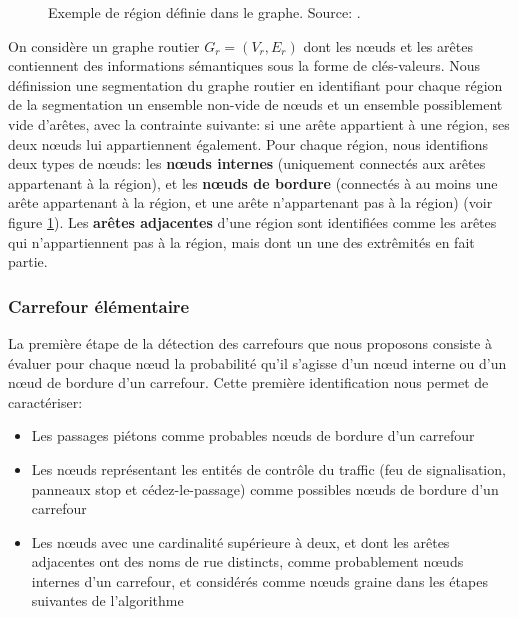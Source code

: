 \begin{figure}[ht]
    \centering
    \caption[Régions du graphe de carrefour]{Exemple de région définie dans le graphe. Source: \citep{Favreau2022}.}
    \label{fig:modelisation_region_segmentation}
\end{figure}

On considère un graphe routier $G_r = (V_r,E_r)$ dont les nœuds et les arêtes contiennent des informations sémantiques sous la forme de clés-valeurs. Nous définission une segmentation du graphe routier en identifiant pour chaque région de la segmentation un ensemble non-vide de nœuds et un ensemble possiblement vide d'arêtes, avec la contrainte suivante: si une arête appartient à une région, ses deux nœuds lui appartiennent également.
Pour chaque région, nous identifions deux types de nœuds: les \textbf{nœuds internes} (uniquement connectés aux arêtes appartenant à la région), et les \textbf{nœuds de bordure} (connectés à au moins une arête appartenant à la région, et une arête n'appartenant pas à la région) (voir figure \ref{fig:modelisation_region_segmentation}).
Les \textbf{arêtes adjacentes} d'une région sont identifiées comme les arêtes qui n'appartiennent pas à la région, mais dont un une des extrêmités en fait partie.

\subsubsection{Carrefour élémentaire}

La première étape de la détection des carrefours que nous proposons consiste à évaluer pour chaque nœud la probabilité qu'il s'agisse d'un nœud interne ou d'un nœud de bordure d'un carrefour.
Cette première identification nous permet de caractériser:

\begin{itemize}
    \item Les passages piétons comme probables nœuds de bordure d'un carrefour
    \item Les nœuds représentant les entités de contrôle du traffic (feu de signalisation, panneaux stop et cédez-le-passage) comme possibles nœuds de bordure d'un carrefour
    \item Les nœuds avec une cardinalité supérieure à deux, et dont les arêtes adjacentes ont des noms de rue distincts, comme probablement nœuds internes d'un carrefour, et considérés comme nœuds graine dans les étapes suivantes de l'algorithme
\end{itemize}

